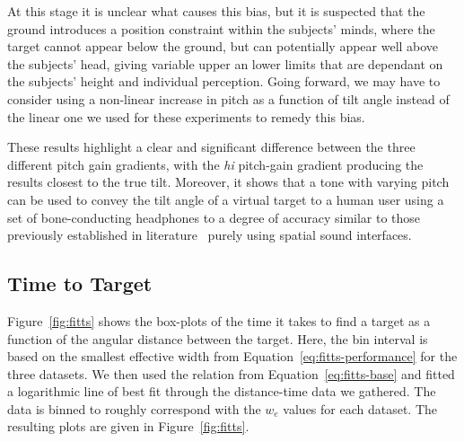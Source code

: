 \documentclass[format=sigconf, review=true, screen=true, anonymous=true]{acmart}
\begin{document}
At this stage it is unclear what causes this bias, but it is suspected that the ground introduces a position constraint within the subjects' minds, where the target cannot appear below the ground, but can potentially appear well above the subjects' head, giving variable upper an lower limits that are dependant on the subjects' height and individual perception. Going forward, we may have to consider using a non-linear increase in pitch as a function of tilt angle instead of the linear one we used for these experiments to remedy this bias. 

These results highlight a clear and significant difference between the three different pitch gain gradients, with the \emph{hi} pitch-gain gradient producing the results closest to the true tilt. Moreover, it shows that a tone with varying pitch can be used to convey the tilt angle of a virtual target to a human user using a set of bone-conducting headphones to a degree of accuracy similar to those previously established in literature~\cite{bujacz2011sonification, katz2011spatial, zotkin2004rendering} purely using spatial sound interfaces.


\subsection{Time to Target}

Figure~\ref{fig:fitts} shows the box-plots of the time it takes to find a target as a function of the angular distance between the target. Here, the bin interval is based on the smallest effective width from Equation~\ref{eq:fitts-performance} for the three datasets. We then used the relation from Equation~\ref{eq:fitts-base} and fitted a logarithmic line of best fit through the distance-time data we gathered. The data is binned to roughly correspond with the $w_e$ values for each dataset. The resulting plots are given in Figure~\ref{fig:fitts}. 
\end{document}
